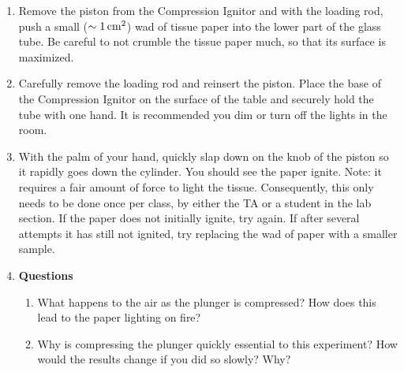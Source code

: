 \begin{enumerate}
	\item Remove the piston from the Compression Ignitor and with the loading rod, push a small ($\sim 1 \, {\rm cm}^{2}$) wad of tissue paper into the lower part of the glass tube.  Be careful to not crumble the tissue paper much, so that its surface is maximized.
	\item Carefully remove the loading rod and reinsert the piston.  Place the base of the Compression Ignitor on the surface of the table and securely hold the tube with one hand.  It is recommended you dim or turn off the lights in the room.
	\item With the palm of your hand, quickly slap down on the knob of the piston so it rapidly goes down the cylinder.  You should see the paper ignite.  Note: it requires a fair amount of force to light the tissue.  Consequently, this only needs to be done once per class, by either the TA or a student in the lab section.  If the paper does not initially ignite, try again.  If after several attempts it has still not ignited, try replacing the wad of paper with a smaller sample.
	\item \textbf{Questions}
	\begin{enumerate}
		\item What happens to the air as the plunger is compressed?  How does this lead to the paper lighting on fire?
		\item Why is compressing the plunger quickly essential to this experiment?  How would the results change if you did so slowly?  Why?
	\end{enumerate}
\end{enumerate}

